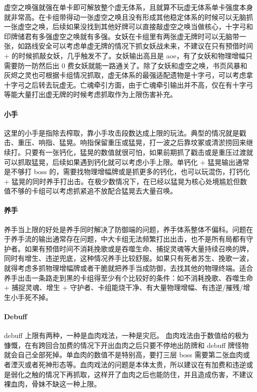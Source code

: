 \documentclass[12pt, a4paper]{article}
\begin{document}
虚空之唤强就强在单卡即可解放整个虚无体系，且就算不玩虚无体系单卡强度本身就非常高。在卡组带得动一张虚空之唤且没有形成其他稳定体系的时候可以无脑抓一张虚空之唤，后续如果没找到其他好牌可以直接敲虚空之唤当做核心，十字弓和印牌储君有多强虚空之唤就有多强。女妖在卡组里有两张虚无牌时可以无脑带一张，如路线安全可以考虑单虚无牌的情况下抓女妖战未来，不建议在只有预借时间+ 的时候抓敲女妖，几乎触发不了。女妖输出高且是 aoe，有了女妖和物理增幅只需要防一防然后出 0 费女妖就能一路通关了。除了女妖和虚空之唤，书页风暴和灰烬之灵也可根据卡组情况抓取，虚无体系的最强适配遗物是十字弓，可以考虑拿十字弓之后转去玩虚无。亡魂牵引方面，由于亡魂牵引输出并不高，仅在有十字弓等能大量打出虚无牌的时候考虑抓取作为上限伤害补充。

\paragraph{小手}
这里的小手是指除去榨取，靠小手攻击段数达成上限的玩法。典型的情况就是戳击、重压、响指、猛晃。响指保留重压或猛晃，打一波之后靠坟冢或清淤捞回来继续打。只要有一张钙化，猛晃的数值就很可怕，如果前期抓了戳击或是重压过渡就可以抓取猛晃，后续如果遇到钙化就可以考虑小手上限。单钙化 + 猛晃输出通常是不够打 boss 的，需要找物理增幅牌或是抓更多的钙化，也可以玩混伤，打钙化 + 猛晃的同时养手打出击。在极少数情况下，在已经以猛晃为核心处境尴尬但数值不够的卡组可以考虑抓紧追不放配合猛晃去大量召唤。

\paragraph{养手}
养手当上限的好处是养手同时解决了防御端的问题，养手体系整体不偏科。问题在于养手流的输出通常存在问题，中大卡组无法频繁打出出击，也不是所有局都有守护者。如果有预借时间不消耗挽歌或是吞噬生命、捕捉灵魂等大量持续召唤的牌，同时有增生、违逆兜底，这种情况养手比较舒服。如果只有死者苏生、挽歌一波，就得考虑多抓物理增幅牌或者干脆就把养手当成防御，去找其他的物理终端。适合养手出击一条路走到黑的卡组得至少有个比较好的条件：如不消耗挽歌、吞噬生命 + 捕捉灵魂、增生 + 守护者、卡组能烧干净、有大量物理增幅、有违逆/摧残/增生小手死不掉。

\paragraph{Debuff}
debuff 上限有两种，一种是血肉戏法，一种是灾厄。
血肉戏法由于数值给的极为慷慨，在有跨回合加费的情况下开出血肉之后只要不停地出防牌和 debuff 牌怪物就会自己全部死掉。单血肉的数值不是特别高，要打三层 boss 需要第二张血肉或者湮灭或者死神形态等。血肉戏法的问题是本体太贵，所以建议在有加费和违逆或是弱化之触的情况下再抓取，这样开了血肉之后也能防住，并且造成伤害，不建议裸血肉，骨妹不缺这一种上限。
\end{document}
